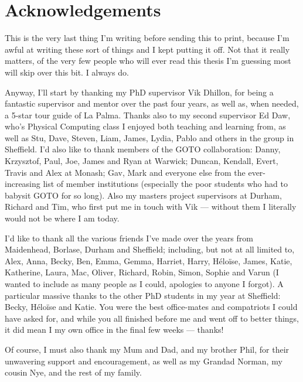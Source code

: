 \chapter*{Acknowledgements}

\begin{onehalfspace}

This is the very last thing I'm writing before sending this to print, because I'm awful at writing these sort of things and I kept putting it off. Not that it really matters, of the very few people who will ever read this thesis I'm guessing most will skip over this bit. I always do.

\medskip

Anyway, I'll start by thanking my PhD supervisor Vik Dhillon, for being a fantastic supervisor and mentor over the past four years, as well as, when needed, a 5-star tour guide of La Palma. Thanks also to my second supervisor Ed Daw, who's Physical Computing class I enjoyed both teaching and learning from, as well as Stu, Dave, Steven, Liam, James, Lydia, Pablo and others in the group in Sheffield. I'd also like to thank members of the GOTO collaboration: Danny, Krzysztof, Paul, Joe, James and Ryan at Warwick; Duncan, Kendall, Evert, Travis and Alex at Monash; Gav, Mark and everyone else from the ever-increasing list of member institutions (especially the poor students who had to babysit GOTO for so long). Also my masters project supervisors at Durham, Richard and Tim, who first put me in touch with Vik --- without them I literally would not be where I am today.

\medskip

I'd like to thank all the various friends I've made over the years from Maidenhead, Borlase, Durham and Sheffield; including, but not at all limited to, Alex, Anna, Becky, Ben, Emma, Gemma, Harriet, Harry, Héloïse, James, Katie, Katherine, Laura, Mac, Oliver, Richard, Robin, Simon, Sophie and Varun (I wanted to include as many people as I could, apologies to anyone I forgot). A particular massive thanks to the other PhD students in my year at Sheffield: Becky, Héloïse and Katie. You were the best office-mates and compatriots I could have asked for, and while you all finished before me and went off to better things, it did mean I my own office in the final few weeks --- thanks!

\medskip

Of course, I must also thank my Mum and Dad, and my brother Phil, for their unwavering support and encouragement, as well as my Grandad Norman, my cousin Nye, and the rest of my family.


\end{onehalfspace}
